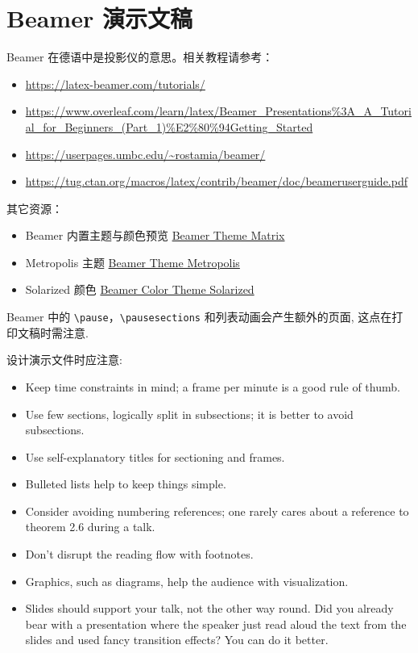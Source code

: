 \chapter{Beamer 演示文稿}

Beamer 在德语中是投影仪的意思。相关教程请参考：

\begin{itemize}
  \item \url{https://latex-beamer.com/tutorials/}
  \item \url{https://www.overleaf.com/learn/latex/Beamer_Presentations%3A_A_Tutorial_for_Beginners_(Part_1)%E2%80%94Getting_Started}
  \item \url{https://userpages.umbc.edu/~rostamia/beamer/}
  \item \url{https://tug.ctan.org/macros/latex/contrib/beamer/doc/beameruserguide.pdf}
\end{itemize}

其它资源：

\begin{itemize}
  \item Beamer 内置主题与颜色预览 \href{https://mpetroff.net/files/beamer-theme-matrix/}{Beamer Theme Matrix}
  \item Metropolis 主题 \href{https://github.com/matze/mtheme}{Beamer Theme Metropolis}
  \item Solarized 颜色 \href{https://github.com/jrnold/beamercolorthemesolarized}{Beamer Color Theme Solarized}
\end{itemize}

Beamer 中的 \verb|\pause|，\verb|\pausesections| 和列表动画会产生额外的页面, 这点在打印文稿时需注意.

设计演示文件时应注意:

\begin{itemize}
  \item Keep time constraints in mind; a frame per minute is a good rule of thumb.
  \item Use few sections, logically split in subsections; it is better to avoid subsections.
  \item Use self-explanatory titles for sectioning and frames.
  \item Bulleted lists help to keep things simple.
  \item Consider avoiding numbering references; one rarely cares about a
reference to theorem 2.6 during a talk.
  \item Don't disrupt the reading flow with footnotes.
  \item Graphics, such as diagrams, help the audience with visualization.   
  \item Slides should support your talk, not the other way round. Did you
already bear with a presentation where the speaker just read aloud the text from the slides and used fancy transition effects? You can do it better.
\end{itemize}

